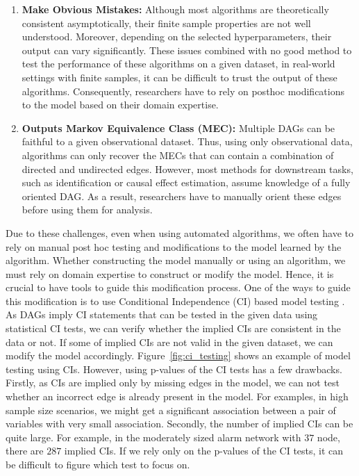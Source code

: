 \documentclass[letterpaper]{article} %
\begin{document}
\begin{enumerate}
	\item \textbf{Make Obvious Mistakes:} Although most algorithms are
		theoretically consistent asymptotically, their finite sample
		properties are not well understood. Moreover, depending on the
		selected hyperparameters, their output can vary significantly.
		These issues combined with no good method to test the
		performance of these algorithms on a given dataset, in
		real-world settings with finite samples, it can be difficult to
		trust the output of these algorithms. Consequently, researchers
		have to rely on posthoc modifications to the model based on
		their domain expertise.
	\item \textbf{Outputs Markov Equivalence Class (MEC):} Multiple
		DAGs can be faithful to a given observational dataset. Thus,
		using only observational data, algorithms can only recover the
		MECs that can contain a combination of directed and undirected
		edges. However, most methods for downstream tasks, such as
		identification or causal effect estimation, assume knowledge of
		a fully oriented DAG. As a result, researchers have to manually
		orient these edges before using them for analysis.
\end{enumerate}


Due to these challenges, even when using automated algorithms, we often have to
rely on manual post hoc testing and modifications to the model learned by the
algorithm. Whether constructing the model manually or using an algorithm, we
must rely on domain expertise to construct or modify the model. Hence, it is
crucial to have tools to guide this modification process. One of the ways to
guide this modification is to use Conditional Independence (CI) based model
testing \cite{Ankan2023}. As DAGs imply CI statements that can be tested in the
given data using statistical CI tests, we can verify whether the implied CIs
are consistent in the data or not. If some of implied CIs are not valid in the
given dataset, we can modify the model accordingly. Figure~\ref{fig:ci_testing}
shows an example of model testing using CIs. However, using p-values of the CI
tests has a few drawbacks. Firstly, as CIs are implied only by missing edges in
the model, we can not test whether an incorrect edge is already present in the
model. For examples, in high sample size scenarios, we might get a significant
association between a pair of variables with very small association. Secondly,
the number of implied CIs can be quite large. For example, in the moderately
sized alarm network with $ 37 $ node, there are $287$ implied CIs. If we rely
only on the p-values of the CI tests, it can be difficult to figure which test
to focus on.
\end{document}
